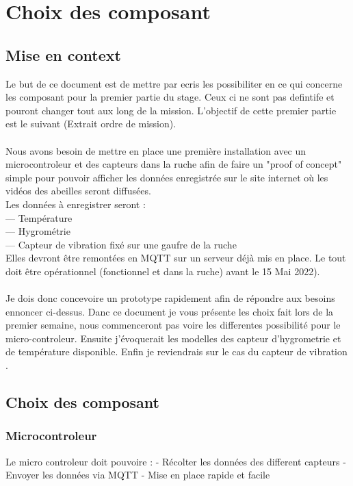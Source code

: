 \documentclass[5pt]{article}
\begin{document}
\section{Choix des composant}

\subsection{Mise en context}

Le but de ce document est de mettre par ecris les possibiliter en ce qui concerne les composant pour la premier partie du stage. Ceux ci ne sont pas defintife et pouront changer tout aux long de la mission. L'objectif de cette premier partie est le suivant (Extrait ordre de mission).\\ 
\\
Nous avons besoin de mettre en place une première installation avec un microcontroleur et
des capteurs dans la ruche afin de faire un "proof of concept" simple pour pouvoir afficher les
données enregistrée sur le site internet où les vidéos des abeilles seront diffusées.\\
Les données à enregistrer seront :\\
— Température\\
— Hygrométrie\\
— Capteur de vibration fixé sur une gaufre de la ruche\\
Elles devront être remontées en MQTT sur un serveur déjà mis en place.
Le tout doit être opérationnel (fonctionnel et dans la ruche) avant le 15 Mai 2022).
\\
\\
Je dois donc concevoire un prototype rapidement afin de répondre aux besoins ennoncer ci-dessus.
Danc ce document je vous présente les choix fait lors de la premier semaine, nous commenceront pas voire les differentes
possibilité pour le micro-controleur. Ensuite j'évoquerait les modelles des capteur d'hygrometrie et de température disponible. 
Enfin je reviendrais sur le cas du capteur de vibration .

\subsection{Choix des composant}

\subsubsection{Microcontroleur}
Le micro controleur doit pouvoire :
	- Récolter les données des different capteurs
	- Envoyer les données via MQTT
	- Mise en place rapide et facile
\end{document}
